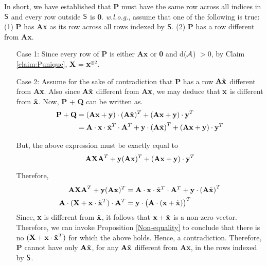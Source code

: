 \noindent In short, we have established that {\bf P} must have the same row across
all indices in ${\sf S}$ and every row outside ${\sf S}$ is {\bf 0}. {\em w.l.o.g.}, assume that one of the following is true: 
(1) {\bf P} has {\bf Ax} as its row across all rows indexed by ${\sf S}$. (2)
{\bf P} has a row different from {\bf Ax}.

\begin{enumerate}
\item [Case 1:] Since every row of {\bf P} is either {\bf Ax} or {\bf 0}
and d(${\cal A}$) $> 0$, by Claim \ref{claim:Punique}, {\bf X} = {\bf x}$^{\otimes
  2}$. 
 
\item [Case 2:] Assume for the sake of contradiction that {\bf P} has a row ${\bf
    A}\tilde{\bf x}$ different from {\bf Ax}. Also  since 
${\bf A}\tilde{\bf x}$ different from {\bf Ax}, we may deduce that 
${\bf x}$ is different from  $\tilde{\bf x}$.  Now, {\bf P} + {\bf Q} can be written
as.
\begin{align*}
  {\bf  P} + {\bf Q} &= ({\bf Ax} +
  {\bf y}) \cdot ({\bf A}\tilde{\bf x})^T + \left({\bf Ax} + {\bf y}
  \right)\cdot {\bf y}^T \\
  & = {\bf A} \cdot {\bf x} \cdot \tilde{\bf x}^T \cdot
  {\bf A}^T + {\bf y}\cdot \left({\bf A}\tilde{\bf x}\right)^T +  \left( {\bf Ax} + {\bf y} \right)\cdot {\bf y}^T
\end{align*}

But, the above expression must be exactly equal to 
 \[
 {\bf AXA}^T + {\bf y}({\bf Ax})^T + \left({\bf Ax} + {\bf y} \right)\cdot {\bf y}^T
\]

Therefore,
\begin{align*}
  {\bf AXA}^T + {\bf y}({\bf Ax})^T &= {\bf A} \cdot {\bf x} \cdot
  \tilde{\bf x}^T \cdot
  {\bf A}^T + {\bf y}\cdot \left({\bf A}\tilde{\bf x}\right)^T\\
  {\bf A} \cdot ({\bf X} + {\bf x} \cdot \tilde{\bf x}^T) \cdot {\bf A}^T &= {\bf y} \cdot \left({\bf A} \cdot \left({\bf x} + \tilde{\bf x}\right)\right)^T
\end{align*}
Since, {\bf x} is different from $\tilde{\bf x}$, it follows that
${\bf x} + \tilde{\bf x}$ is a non-zero vector. Therefore, we can invoke Proposition \ref{Non-equality}
to conclude that there is no $({\bf X} + {\bf x} \cdot \tilde{\bf x}^T)$ for which
the above holds. Hence, a contradiction. Therefore, {\bf P} cannot have 
only ${\bf A}\tilde{\bf x}$, for any ${\bf A}\tilde{\bf x}$ 
different from {\bf Ax}, in the rows indexed by ${\sf S}$.
\end{enumerate}

